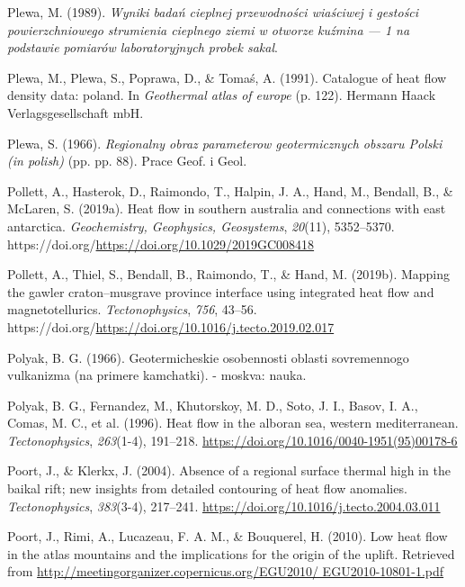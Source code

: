 \begin{CSLReferences}{1}{1}
\leavevmode{}%
Plewa, M. (1989). \emph{Wyniki badań cieplnej przewodności wiaściwej i gestości powierzchniowego strumienia cieplnego ziemi w otworze kuźmina --- 1 na podstawie pomiarów laboratoryjnych probek saka{l}}.

\leavevmode{}%
Plewa, M., Plewa, S., Poprawa, D., \& Tomaś, A. (1991). Catalogue of heat flow density data: poland. In \emph{Geothermal atlas of europe} (p. 122). Hermann Haack Verlagsgesellschaft mbH.

\leavevmode{}%
Plewa, S. (1966). \emph{Regionalny obraz parameterow geotermicznych obszaru {Polski} (in polish)} (pp. pp. 88). Prace Geof. i Geol.

\leavevmode{}%
Pollett, A., Hasterok, D., Raimondo, T., Halpin, J. A., Hand, M., Bendall, B., \& McLaren, S. (2019a). Heat flow in southern australia and connections with east antarctica. \emph{Geochemistry, Geophysics, Geosystems}, \emph{20}(11), 5352--5370. https://doi.org/\url{https://doi.org/10.1029/2019GC008418}

\leavevmode{}%
Pollett, A., Thiel, S., Bendall, B., Raimondo, T., \& Hand, M. (2019b). Mapping the gawler craton--musgrave province interface using integrated heat flow and magnetotellurics. \emph{Tectonophysics}, \emph{756}, 43--56. https://doi.org/\url{https://doi.org/10.1016/j.tecto.2019.02.017}

\leavevmode{}%
Polyak, B. G. (1966). Geotermicheskie osobennosti oblasti sovremennogo vulkanizma (na primere kamchatki). - moskva: nauka.

\leavevmode{}%
Polyak, B. G., Fernandez, M., Khutorskoy, M. D., Soto, J. I., Basov, I. A., Comas, M. C., et al. (1996). Heat flow in the alboran sea, western mediterranean. \emph{Tectonophysics}, \emph{263}(1-4), 191--218. \url{https://doi.org/10.1016/0040-1951(95)00178-6}

\leavevmode{}%
Poort, J., \& Klerkx, J. (2004). Absence of a regional surface thermal high in the baikal rift; new insights from detailed contouring of heat flow anomalies. \emph{Tectonophysics}, \emph{383}(3-4), 217--241. \url{https://doi.org/10.1016/j.tecto.2004.03.011}

\leavevmode{}%
Poort, J., Rimi, A., Lucazeau, F. A. M., \& Bouquerel, H. (2010). Low heat flow in the atlas mountains and the implications for the origin of the uplift. Retrieved from \href{http://meetingorganizer.copernicus.org/EGU2010/\%20EGU2010-10801-1.pdf}{http://meetingorganizer.copernicus.org/EGU2010/ EGU2010-10801-1.pdf}


\end{CSLReferences}
